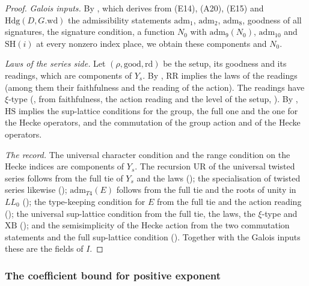 \begin{proof}
\emph{Galois inputs.} By , which derives from (E14), (A20), (E15)
and $\mathrm{Hdg}(D,G.\mathrm{wd})$ the admissibility statements $\mathrm{adm}_1$, $\mathrm{adm}_2$, $\mathrm{adm}_8$, goodness
of all signatures, the signature condition, a function $N_0$ with $\mathrm{adm}_9(N_0)$, $\mathrm{adm}_{10}$ and
$\mathrm{SH}(i)$ at every nonzero index place, we obtain these components and $N_0$.

\emph{Laws of the series side.} Let $(\rho,\mathrm{good},\mathrm{rd})$ be the setup, its goodness and its readings,
which are components of $Y_s$. By , $\mathrm{RR}$ implies the laws of
the readings (among them their faithfulness and the reading of the action). The readings have $\xi$-type
(, from faithfulness, the action reading and the level of the setup,
). By ,
$\mathrm{HS}$ implies the sup-lattice conditions for the group, the full one and the one for the Hecke operators,
and the commutation of the group action and of the Hecke operators.

\emph{The record.} The universal character condition and the range condition on the Hecke indices are components of
$Y_s$. The recursion $\mathrm{UR}$ of the universal twisted series follows from the full tie of $Y_s$ and the laws
(); the specialisation of twisted series
likewise (); $\mathrm{adm}_{T4}(E)$
follows from the full tie and the roots of unity in $\mathit{LL}_0$ ();
the type-keeping condition for $E$ from the full tie and the action reading
(); the universal sup-lattice condition from the full tie, the
laws, the $\xi$-type and $\mathrm{XB}$ (); and the semisimplicity of the
Hecke action from the two commutation statements and the full sup-lattice condition
(). Together with the Galois inputs these are the fields of $I$.
\end{proof}

\subsubsection{The coefficient bound for positive exponent}\label{pf:baselat1:sssec:boundproofs}


